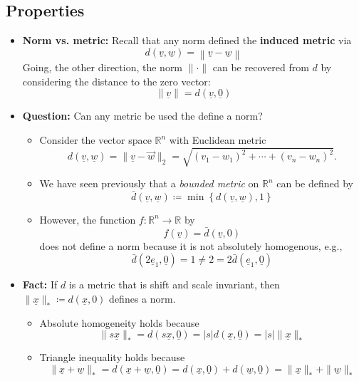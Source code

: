 \documentclass[11pt,twoside]{report}
\newcommand{\bbR}{{\mathbb{R}}}
\newcommand{\vecnot}{\underline}
\begin{document}
\subsection{Properties} 

\begin{itemize}

\item \textbf{Norm vs. metric:}  Recall that any norm defined the \textbf{induced metric} via 
\[
d \left( \vecnot{v}, \vecnot{w} \right)
= \left\| \vecnot{v} - \vecnot{w} \right\|
\]
Going, the other direction, the norm $\|\cdot\|$ can be recovered from $d$ by considering the distance to the zero vector: 
\[
\|\vecnot{v}\| = d(\vecnot{v} ,\vecnot{0}) 
\]



\item \textbf{Question:}  Can any metric be used the define a norm? 
\begin{itemize}
\item Consider the vector space $\bbR^n$ with Euclidean metric 
\[
d \left( \vecnot{v}, \vecnot{w} \right) = \| \vecnot{v} - \vec{w} \|_2 
= \sqrt{ (v_1 - w_1)^2 + \cdots + (v_n - w_n)^2 }.
\]

\item We have seen previously that a \emph{bounded metric} on $\bbR^n$ can be defined by
\[
\bar{d} \left( \vecnot{v}, \vecnot{w} \right)
\coloneqq \min \left\{ d \left( \vecnot{v}, \vecnot{w} \right), 1 \right\}
\]
\item However, the function  $f \colon \bbR^n \to \bbR$ by
\[
f(\vecnot{v}) = \bar{d} ( \vecnot{v}, 0) 
\]
does not define a norm because it is not absolutely homogenous, e.g., 
\[
\bar{d} \left( 2 \vecnot{e}_1, \vecnot{0} \right) = 1 \ne  2  = 2 \bar{d} \left( \vecnot{e}_1, \vecnot{0} \right)
\]


\end{itemize} 

\item \textbf{Fact:} If $d$ is a metric that is shift and scale invariant, then $\|\vecnot{x}  \|_*  \coloneqq d(\vecnot{x}, 0)$ defines a norm. 
\begin{itemize}
\item Absolute homogeneity holds because
\[
\| s \vecnot{x} \|_* = d( s \vecnot{x}, \vecnot{0}) = | s| d( \vecnot{x},\vecnot{0}) = |s| \|  \vecnot{x} \|_*
\]
\item Triangle inequality holds because
\[
\| \vecnot{x} +\vecnot{w} \|_* = d( \vecnot{x} +\vecnot{w}, \vecnot{0}) = d( \vecnot{x} , \vecnot{0})  +  d( \vecnot{w}, \vecnot{0})  = \| \vecnot{x}  \|_*  + \|\vecnot{w} \|_* 
\]


\end{itemize}
\end{itemize}
\end{document}
